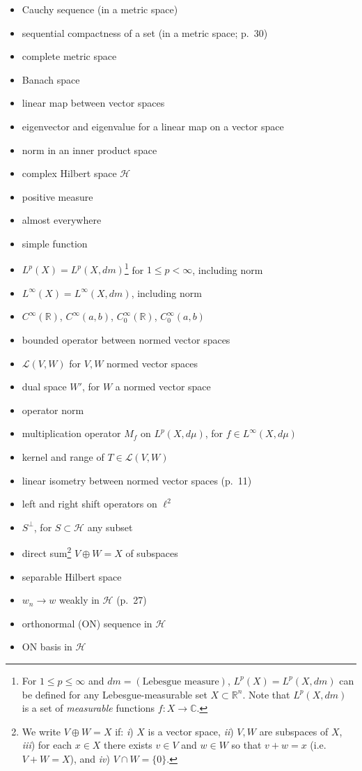 \documentclass[12pt]{amsart}
\newcommand{\cH}{\mathcal{H}}
\newcommand{\cL}{\mathcal{L}}
\newcommand{\CC}{{\mathbb{C}}}
\newcommand{\RR}{{\mathbb{R}}}
\begin{document}
\begin{itemize}
FIXME
\item Cauchy sequence (in a metric space)
\item sequential compactness of a set (in a metric space; p.~30)
\item complete metric space
\item Banach space
\item linear map between vector spaces
\item eigenvector and eigenvalue for a linear map on a vector space
\item norm in an inner product space
\item complex Hilbert space $\cH$
\item positive measure
\item almost everywhere
\item simple function
\item $L^p(X)=L^p(X,dm)$\footnote{For $1\le p \le \infty$ and $dm=(\text{Lebesgue measure})$, $L^p(X)=L^p(X,dm)$ can be defined for any Lebesgue-measurable set $X\subset \RR^n$.  Note that $L^p(X,dm)$ is a set of \emph{measurable} functions $f:X\to\CC$.} for $1\le p < \infty$, including norm
\item $L^\infty(X)=L^\infty(X,dm)$, including norm
\item $C^\infty(\RR)$, $C^\infty(a,b)$, $C_0^\infty(\RR)$, $C_0^\infty(a,b)$
\item bounded operator between normed vector spaces
\item $\cL(V,W)$ for $V,W$ normed vector spaces
\item dual space $W'$, for $W$ a normed vector space
\item operator norm
\item multiplication operator $M_f$ on $L^p(X,d\mu)$, for $f\in L^\infty(X,d\mu)$
\item kernel and range of $T \in \cL(V,W)$
\item linear isometry between normed vector spaces (p.~11)
\item left and right shift operators on $\ell^2$
\item $S^\perp$, for $S\subset \cH$ any subset
\item direct sum\footnote{We write $V\oplus W=X$ if: \quad \emph{i}) $X$ is a vector space, \emph{ii}) $V,W$ are subspaces of $X$, \emph{iii}) for each $x\in X$ there exists $v\in V$ and $w\in W$ so that $v+w=x$ (i.e.~$V+W=X$), and \emph{iv}) $V\cap W = \{0\}$.} $V\oplus W=X$ of subspaces
\item separable Hilbert space
\item $w_n \to w$ weakly in $\cH$ (p.~27)
\item orthonormal (ON) sequence in $\cH$
\item ON basis in $\cH$
\end{itemize}
\end{document}
